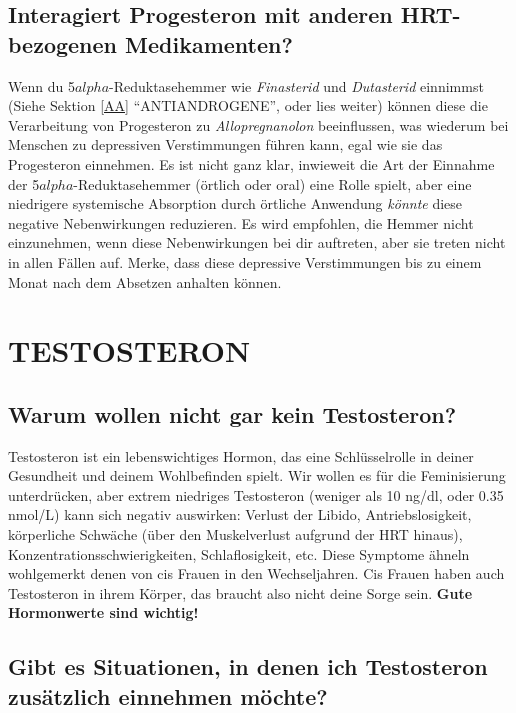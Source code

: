 \documentclass{article}
\begin{document}
\subsection{Interagiert Progesteron mit anderen HRT-bezogenen Medikamenten?}\label{8-18}

Wenn du 5$alpha$-Reduktasehemmer wie \textit{Finasterid} und \textit{Dutasterid} einnimmst (Siehe Sektion \ref{AA} “ANTIANDROGENE”, oder lies weiter) können diese die Verarbeitung von Progesteron zu \textit{Allopregnanolon} beeinflussen, was wiederum bei Menschen zu depressiven Verstimmungen führen kann, egal wie sie das Progesteron einnehmen. Es ist nicht ganz klar, inwieweit die Art der Einnahme der 5$alpha$-Reduktasehemmer (örtlich oder oral) eine Rolle spielt, aber eine niedrigere systemische Absorption durch örtliche Anwendung \textit{könnte }diese negative Nebenwirkungen reduzieren. Es wird empfohlen, die Hemmer nicht einzunehmen, wenn diese Nebenwirkungen bei dir auftreten, aber sie treten nicht in allen Fällen auf. Merke, dass diese depressive Verstimmungen bis zu einem Monat nach dem Absetzen anhalten können. 

\section{TESTOSTERON}\label{T}

\subsection{Warum wollen nicht \textbf{gar kein} Testosteron?}

Testosteron ist ein lebenswichtiges Hormon, das eine Schlüsselrolle in deiner Gesundheit und deinem Wohlbefinden spielt. Wir wollen es für die Feminisierung unterdrücken, aber extrem niedriges Testosteron (weniger als 10 ng/dl, oder 0.35 nmol/L) kann sich negativ auswirken: Verlust der Libido, Antriebslosigkeit, körperliche Schwäche (über den Muskelverlust aufgrund der HRT hinaus), Konzentrationsschwierigkeiten, Schlaflosigkeit, etc. Diese Symptome ähneln wohlgemerkt denen von cis Frauen in den Wechseljahren. Cis Frauen haben auch Testosteron in ihrem Körper, das braucht also nicht deine Sorge sein. \textbf{Gute Hormonwerte sind wichtig!}

\subsection{Gibt es Situationen, in denen ich Testosteron zusätzlich einnehmen möchte?}\label{9-2}
\end{document}
